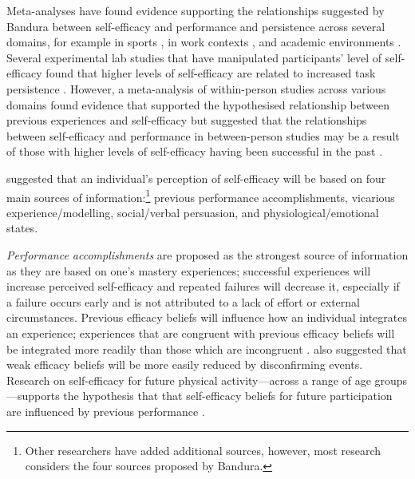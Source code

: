 \documentclass[
  12pt,
  a4paper,
]{book}
\begin{document}
Meta-analyses have found evidence supporting the relationships suggested by Bandura between self-efficacy and performance and persistence across several domains, for example in sports \citep{Moritz2000}, in work contexts \citep{Stajkovic1998}, and academic environments \citep{Multon1991}. Several experimental lab studies that have manipulated participants' level of self-efficacy found that higher levels of self-efficacy are related to increased task persistence \citep{Hutchinson2008, Tenenbaum2001, Weinberg1979, Weinberg1980, Weinberg1981}. However, a meta-analysis of within-person studies across various domains found evidence that supported the hypothesised relationship between previous experiences and self-efficacy but suggested that the relationships between self-efficacy and performance in between-person studies may be a result of those with higher levels of self-efficacy having been successful in the past \citep{Sitzmann2013}.

\citet{Bandura1982} suggested that an individual's perception of self-efficacy will be based on four main sources of information:\footnote{Other researchers \citep[e.g.,][]{Maddux1995} have added additional sources, however, most research considers the four sources proposed by Bandura.} previous performance accomplishments, vicarious experience/modelling, social/verbal persuasion, and physiological/emotional states.

\emph{Performance accomplishments} are proposed as the strongest source of information as they are based on one's mastery experiences; successful experiences will increase perceived self-efficacy and repeated failures will decrease it, especially if a failure occurs early and is not attributed to a lack of effort or external circumstances. Previous efficacy beliefs will influence how an individual integrates an experience; experiences that are congruent with previous efficacy beliefs will be integrated more readily than those which are incongruent \citep{Bandura1997, Cervone1990, Chase2001}. \citet{Bandura1997} also suggested that weak efficacy beliefs will be more easily reduced by disconfirming events. Research on self-efficacy for future physical activity---across a range of age groups---supports the hypothesis that that self-efficacy beliefs for future participation are influenced by previous performance \citep[e.g.,][]{Dawson2000, McAuley2006, Miller2002}.
\end{document}
